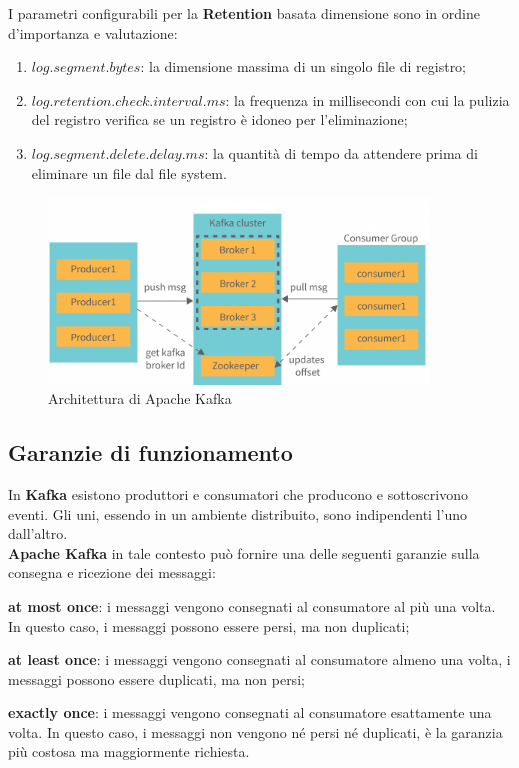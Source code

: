I parametri configurabili per la \textbf{Retention} basata dimensione sono in ordine d'importanza e valutazione:
\begin{enumerate}
    \item $log.segment.bytes$: la dimensione massima di un singolo file di registro;
    \item $log.retention.check.interval.ms$: la frequenza in millisecondi con cui la pulizia del registro verifica se un registro è idoneo per l'eliminazione;
    \item $log.segment.delete.delay.ms$: la quantità di tempo da attendere prima di eliminare un file dal file system.
\end{enumerate}
\begin{figure}[h]
    \centering
    \includegraphics[width=0.9\textwidth]{images/componenti/kafka_architetcture.png}
    \caption{Architettura di Apache Kafka}
    \label{fig:kafka_architecture}
\end{figure}
\subsection{Garanzie di funzionamento}
In \textbf{Kafka} esistono produttori e consumatori che producono e sottoscrivono eventi. Gli uni, essendo in un ambiente distribuito,
sono indipendenti l’uno dall’altro. \\
\textbf{Apache Kafka} in tale contesto può fornire una delle seguenti garanzie sulla consegna e ricezione dei messaggi:
\begin{list}{*}
    \item \textbf{at most once}: i messaggi vengono consegnati al consumatore al più una volta. In questo caso, i messaggi possono essere persi, ma non duplicati;
   \item \item  \textbf{at least once}: i messaggi vengono consegnati al consumatore almeno una volta, i messaggi possono essere duplicati, ma non persi;
    \item \textbf{exactly once}: i messaggi vengono consegnati al consumatore esattamente una volta. In questo caso, i messaggi non vengono né persi né duplicati, è la garanzia più costosa ma maggiormente richiesta.
\end{list}
